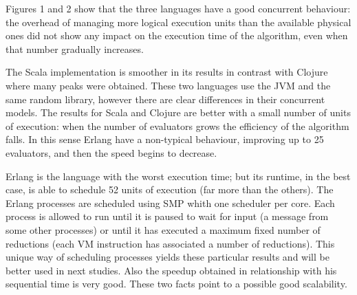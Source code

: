 %     

%     


%    
%
%
%    
%

Figures 1 and 2 show that the three languages have a good concurrent behaviour: the overhead of managing more logical execution units than the available physical ones did not show any impact on the execution time of the algorithm, even when that number gradually increases.

%
%    

The Scala implementation is smoother in its results in contrast with
Clojure where many peaks were obtained. %
These two languages use the JVM and the same random library, however there are clear differences in their concurrent models. The results for Scala and Clojure are better with a small number of units of execution: when the number of evaluators grows the efficiency of the algorithm falls. In this sense Erlang have a non-typical behaviour, improving up to 25 evaluators, and then the speed begins to decrease.

Erlang is the language with the worst execution time; but its runtime, in the best case, is able to schedule 52 units of execution (far more than the others). The Erlang processes are scheduled using SMP whith one scheduler per core. Each process is allowed to run until it is paused to wait for input (a message from some other processes) or until it has executed a maximum fixed number of reductions (each VM instruction has associated a number of reductions). This unique way of scheduling processes yields these particular results and will be better used in next studies. Also the speedup obtained in relationship with his sequential time is very good. These two facts point to a possible good scalability.

